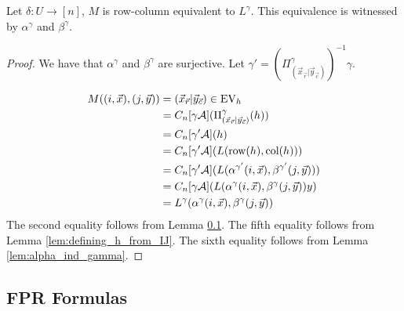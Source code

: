\documentclass[../paper.tex]{subfiles}
\begin{document}
\begin{thm}
  Let $\delta: U \rightarrow [n]$, $M$ is row-column equivalent to $L^{\gamma}$.
  This equivalence is witnessed by $\alpha^{\gamma}$ and $\beta^{\gamma}$.
\end{thm}
\begin{proof}
  We have that $\alpha^{\gamma}$ and $\beta^{\gamma}$ are surjective. Let
  $\gamma' = (\Pi^{\gamma}_{(\vec{x}_{\vec{r}} \vert \vec{y}_{\vec{c}})})^{-1}
  \gamma$.

  \begin{align*}
    M((i, \vec{x}), (j, \vec{y}))
    &= (\vec{x}_{\vec{r}} \vert \vec{y}_{\vec{c}}) \in \text{EV}_h \\
    &= C_n[\gamma \mathcal{A}] (\Pi^{\gamma}_{(\vec{x}_{\vec{r}} \vert \vec{y}_{\vec{c}})} (h)) \\
    &= C_n[\gamma' \mathcal{A}] (h) \\
    &= C_n[\gamma' \mathcal{A}](L(\text{row}(h), \text{col} (h)))\\
    &= C_n[\gamma' \mathcal{A}](L(\alpha^{\gamma'}(i, \vec{x}), \beta^{\gamma'}(j, \vec{y})))\\
    &= C_n[\gamma \mathcal{A}](L(\alpha^{\gamma}(i, \vec{x}), \beta^{\gamma}(j, \vec{y}))y)\\
    &= L^{\gamma}(\alpha^{\gamma}(i, \vec{x}), \beta^{\gamma}(j, \vec{y}))
  \end{align*}
  The second equality follows from Lemma \ref{}. The fifth equality follows from
  Lemma \ref{lem:defining_h_from_IJ}. The sixth equality follows from Lemma
  \ref{lem:alpha_ind_gamma}.

  
\end{proof}

\subsection{FPR Formulas}
\end{document}
